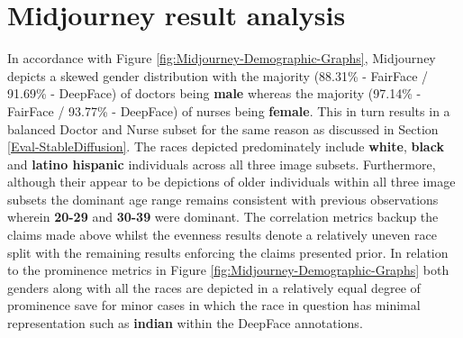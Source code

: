 {%


}


\section{Midjourney result analysis}\label{Eval-Midjourney}

In accordance with Figure \ref{fig:Midjourney-Demographic-Graphs}, Midjourney depicts a skewed gender distribution with the majority (88.31\% - FairFace / 91.69\% - DeepFace) of doctors being \textbf{male} whereas the majority (97.14\% - FairFace / 93.77\% - DeepFace) of nurses being \textbf{female}. This in turn results in a balanced Doctor and Nurse subset for the same reason as discussed in Section \ref{Eval-StableDiffusion}. The races depicted predominately include \textbf{white}, \textbf{black} and \textbf{latino hispanic} individuals across all three image subsets. Furthermore, although their appear to be depictions of older individuals within all three image subsets the dominant age range remains consistent with previous observations wherein \textbf{20-29} and \textbf{30-39} were dominant. The correlation metrics backup the claims made above whilst the evenness results denote a relatively uneven race split with the remaining results enforcing the claims presented prior. In relation to the prominence metrics in Figure \ref{fig:Midjourney-Demographic-Graphs} both genders along with all the races are depicted in a relatively equal degree of prominence save for minor cases in which the race in question has minimal representation such as \textbf{indian} within the DeepFace annotations. 

